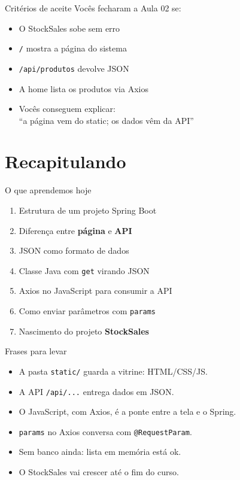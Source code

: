 \documentclass[aspectratio=169,11pt]{beamer}
\begin{document}
\begin{frame}{Critérios de aceite}
  Vocês fecharam a Aula 02 se:

  \vspace{0.5em}
  \begin{itemize}
    \item [ ] O StockSales sobe sem erro
    \item [ ] \texttt{/} mostra a página do sistema
    \item [ ] \texttt{/api/produtos} devolve JSON
    \item [ ] A home lista os produtos via Axios
    \item [ ] Vocês conseguem explicar:\\
              ``a página vem do static; os dados vêm da API''
  \end{itemize}
\end{frame}

\section{Recapitulando}

\begin{frame}{O que aprendemos hoje}
  \begin{enumerate}
    \item Estrutura de um projeto Spring Boot
    \item Diferença entre \textbf{página} e \textbf{API}
    \item JSON como formato de dados
    \item Classe Java com \texttt{get} virando JSON
    \item Axios no JavaScript para consumir a API
    \item Como enviar parâmetros com \texttt{params}
    \item Nascimento do projeto \textbf{StockSales}
  \end{enumerate}
\end{frame}

\begin{frame}{Frases para levar}
  \begin{itemize}
    \item A pasta \texttt{static/} guarda a vitrine: HTML/CSS/JS.
    \item A API \texttt{/api/...} entrega dados em JSON.
    \item O JavaScript, com Axios, é a ponte entre a tela e o Spring.
    \item \texttt{params} no Axios conversa com \texttt{@RequestParam}.
    \item Sem banco ainda: lista em memória está ok.
    \item O StockSales vai crescer até o fim do curso.
  \end{itemize}
\end{frame}
\end{document}
